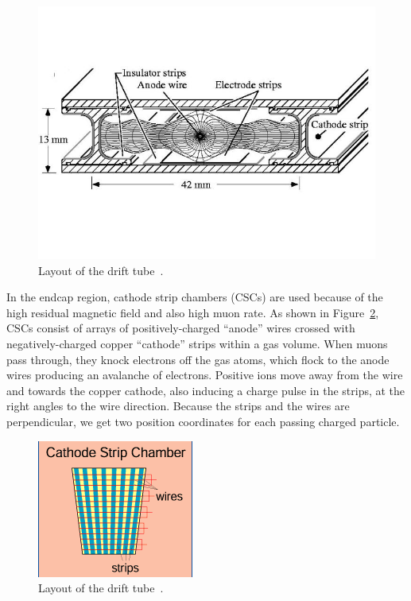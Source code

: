 \begin{figure}[!htbp]
\centering
\includegraphics[width=.8\textwidth]{figures/DriftTubeDetails.jpg}
\caption{Layout of the drift tube~\cite{web:DT}.}
\label{fig:DT}
\end{figure} 
 
In the endcap region,  cathode strip chambers (CSCs) are used because of the high residual magnetic field and also high muon rate. As shown in Figure~\ref{fig:CSC}, 
CSCs consist of arrays of positively-charged ``anode'' wires crossed with negatively-charged copper ``cathode'' strips within a gas volume. When muons pass through, they knock electrons off the gas atoms, which flock to the anode wires producing an avalanche of electrons. Positive ions move away from the wire and towards the copper cathode, also inducing a charge pulse in the strips, at 
the right angles to the wire direction.
Because the strips and the wires are perpendicular, we get two position coordinates for each passing charged particle.

\begin{figure}[!htbp]
\centering
\includegraphics[width=.8\textwidth]{figures/CSC.png}
\caption{Layout of the drift tube~\cite{web:CSC}.}
\label{fig:CSC}
\end{figure} 


